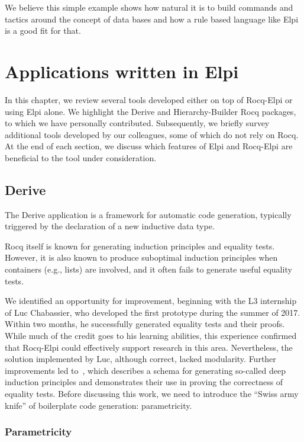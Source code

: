\documentclass[a4paper, 11pt]{book}
\begin{document}
We believe this simple example shows how natural it is to build
commands and tactics around the concept of data bases and how a
rule based language like Elpi is a good fit for that.


\chapter{Applications written in Elpi}

In this chapter, we review several tools developed either on top of Rocq-Elpi
or using Elpi alone.
We highlight the Derive and Hierarchy-Builder Rocq packages, to which we have
personally contributed.
Subsequently, we briefly survey additional tools developed by our colleagues,
some of which do not rely on Rocq.
At the end of each section, we discuss which features of Elpi and Rocq-Elpi are
beneficial to the tool under consideration.

\section{Derive}\label{sec:derive}

The Derive application is a framework for automatic code generation, 
typically triggered by the declaration of a new inductive data type.

Rocq itself is known for generating induction principles and equality tests.
However, it is also known to produce suboptimal induction principles when
containers (e.g., lists) are involved, and it often fails to generate useful
equality tests.

We identified an opportunity for improvement, beginning with the L3
internship of Luc Chabassier, who developed the first prototype during the
summer of 2017. Within two months, he successfully generated equality tests
and their proofs. While much of the credit goes to his learning abilities,
this experience confirmed that Rocq-Elpi could effectively support research
in this area. Nevertheless, the solution implemented by Luc, although correct,
lacked modularity. Further improvements led to~\cite{tassi:hal-01897468},
which describes a schema for generating so-called deep induction principles
and demonstrates their use in proving the correctness of equality tests.
Before discussing this work, we need to introduce the ``Swiss army knife''
of boilerplate code generation: parametricity.

\subsection{Parametricity}\label{sec:param1}
\end{document}
